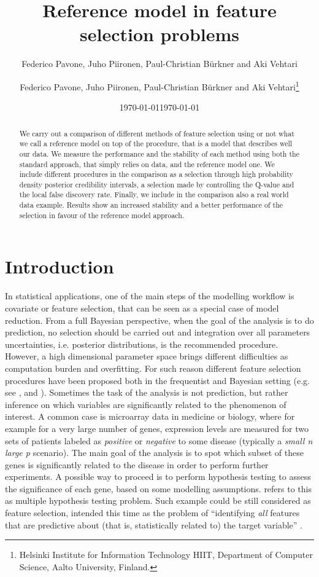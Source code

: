 \documentclass[american,]{article}
\title{Reference model in feature selection problems 
	\vspace{.1in}}
\author{Federico Pavone, Juho Piironen, Paul-Christian B\"{u}rkner and Aki Vehtari}
\author{
    Federico Pavone, 
  Juho Piironen,
  Paul-Christian B\"{u}rkner
  and Aki Vehtari\footnote{Helsinki Institute for Information Technology HIIT,
  Department of Computer Science, Aalto University, Finland.}
  }
\date{\today}
\date{\today}
\theoremstyle{definition}
\begin{document}
\maketitle
\begin{abstract}
We carry out a comparison of different methods of feature selection using or not what we call a reference model on top of the procedure, that is a model that describes well our data. We measure the performance and the stability of each method using both the standard approach, that simply relies on data, and the reference model one. We include different procedures in the comparison as a selection through high probability density posterior credibility intervals, a selection made by controlling the Q-value and the local false discovery rate. Finally, we include in the comparison also a real world data example. Results show an increased stability and a better performance of the selection in favour of the reference model approach.
\end{abstract}

\hypertarget{introduction}{%
\section{Introduction}\label{introduction}}

In statistical applications, one of the main steps of the modelling workflow is covariate or feature selection, that can be seen as a special case of model reduction. From a full Bayesian perspective, when the goal of the analysis is to do prediction, no selection should be carried out and integration over all parameters uncertainties, i.e. posterior distributions, is the recommended procedure. However, a high dimensional parameter space brings different difficulties as computation burden and overfitting. For such reason different feature selection procedures have been proposed both in the frequentist and Bayesian setting (e.g. see \cite{paper:feature_selection}, \cite{paper:vehtari_ojanen} and \cite{paper:model_selection}). Sometimes the task of the analysis is not prediction, but rather inference on which variables are significantly related to the phenomenon of interest. A common case is microarray data in medicine or biology, where for example for a very large number of genes, expression levels are measured for two sets of patients labeled as \textit{positive} or \textit{negative} to some disease (typically a \textit{small n large p} scenario).  The main goal of the analysis is to spot which subset of these genes is significantly related to the disease in order to perform further experiments. A possible way to proceed is to perform hypothesis testing to assess the significance of each gene, based on some modelling assumptions. \cite{book:efron} refers to this as multiple hypothesis testing problem. Such example could be still considered as feature selection, intended this time as the problem of ``identifying \textit{all} features that are predictive about (that is, statistically related to) the target variable'' \citep{paper:projpred}.
\end{document}
